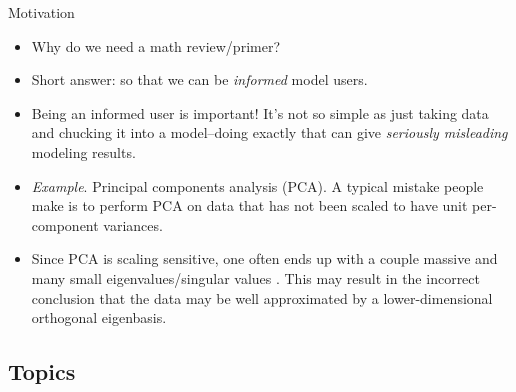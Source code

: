 \documentclass{beamer}
\begin{document}
\begin{frame}{Motivation}
    \begin{itemize}
        \item
        Why do we need a math review/primer?
        
        \item
        Short answer: so that we can be \textit{informed} model users.
        
        \item
        Being an informed user is important! It's not so simple as just taking
        data and chucking it into a model--doing exactly that can give
        \textit{seriously misleading} modeling results.

        \item
        \textit{Example}. Principal components analysis (PCA). A typical
        mistake people make\footnotemark{} is to perform PCA on data that has not been scaled to have unit
        per-component variances.

        \item
        Since PCA is scaling sensitive, one often ends up with a couple massive
        and many small eigenvalues/singular values \footnotemark{}. This may result in the incorrect conclusion that the data may be
        well approximated by a lower-dimensional orthogonal eigenbasis.

        \medskip
    \end{itemize}
\end{frame}

\subsection{Topics}
\end{document}
